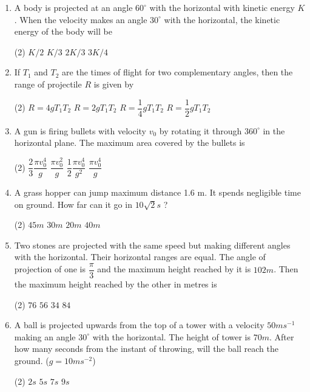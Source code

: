 \documentclass{article}
\renewcommand{\frac}[2]{\dfrac{#1}{#2}}
\begin{document}
\begin{enumerate}
    \item A body is projected at an angle \(60^{\circ}\) with the horizontal with kinetic energy \(K\). When the velocity makes an angle \(30^{\circ}\) with the horizontal, the kinetic energy of the body will be
    \begin{tasks}(2)
        \task \(K/2\)
        \task \(K/3\)
        \task \(2K/3\)
        \task \(3K/4\)
    \end{tasks}

    \item If \(T_1\) and \(T_2\) are the times of flight for two complementary angles, then the range of projectile \(R\) is given by
    \begin{tasks}(2)
        \task \(R = 4gT_1T_2\)
        \task \(R = 2gT_1T_2\)
        \task \(R = \frac{1}{4}gT_1T_2\)
        \task \(R = \frac{1}{2}gT_1T_2\)
    \end{tasks}

    \item A gun is firing bullets with velocity \(v_0\) by rotating it through \(360^{\circ}\) in the horizontal plane. The maximum area covered by the bullets is
    \begin{tasks}(2)
        \task \(\frac{2}{3}\frac{\pi v_0^4}{g}\)
        \task \(\frac{\pi v_0^2}{g}\)
        \task \(\frac{1}{2}\frac{\pi v_0^4}{g^2}\)
        \task \(\frac{\pi v_0^4}{g}\)
    \end{tasks}

    \item A grass hopper can jump maximum distance 1.6 m. It spends negligible time on ground. How far can it go in \(10\sqrt{2} s\) ?
    \begin{tasks}(2)
        \task \(45 m\)
        \task \(30 m\)
        \task \(20 m\)
        \task \(40 m\)
    \end{tasks}

    \item Two stones are projected with the same speed but making different angles with the horizontal. Their horizontal ranges are equal. The angle of projection of one is \(\frac{\pi}{3}\) and the maximum height reached by it is \(102 m\). Then the maximum height reached by the other in metres is
    \begin{tasks}(2)
        \task \(76\)
        \task \(56\)
        \task \(34\)
        \task \(84\)
    \end{tasks}

    \item A ball is projected upwards from the top of a tower with a velocity \(50 ms^{-1}\) making an angle \(30^{\circ}\) with the horizontal. The height of tower is \(70 m\). After how many seconds from the instant of throwing, will the ball reach the ground. (\(g = 10 ms^{-2}\))
    \begin{tasks}(2)
        \task \(2 s\)
        \task \(5 s\)
        \task \(7 s\)
        \task \(9 s\)
    \end{tasks}


\end{enumerate}
\end{document}
